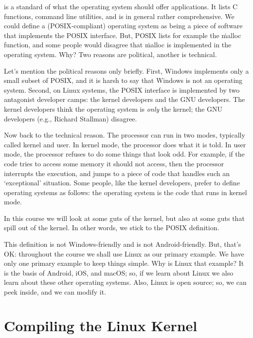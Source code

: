  is a standard of what the operating system should offer applications.
It lists C functions, command line utilities, and is in general rather comprehensive.
We could define a (POSIX-compliant) operating system as being a piece of software
  that implements the POSIX interface.
But, POSIX lists for example the \.{malloc} function,
  and some people would disagree that \.{malloc} is implemented in the operating system.
Why?
Two reasons are political, another is technical.

Let's mention the political reasons only briefly.
First, Windows implements only a small subset of POSIX,
  and it is harsh to say that Windows is not an operating system.
Second, on Linux systems,
  the POSIX interface is implemented by two antagonist developer camps:
  the kernel developers and the GNU developers.
The kernel developers think the operating system is \emph{only} the kernel;
  the GNU developers (e.g., Richard Stallman) disagree.

Now back to the technical reason.
The processor can run in two modes, typically called kernel and user.
In kernel mode, the processor does what it is told.
In user mode, the processor refuses to do some things that look odd.
For example, if the code tries to access some memory it should not access,
  then the processor interrupts the execution,
  and jumps to a piece of code that handles such an `exceptional' situation.
Some people, like the kernel developers,
  prefer to define operating systems as follows:
  the operating system is the code that runs in kernel mode.

In this course we will look at some guts of the kernel,
  but also at some guts that spill out of the kernel.
In other words, we stick to the POSIX definition.

\medskip

This definition is not Windows-friendly and is not Android-friendly.
But, that's OK:
  throughout the course we shall use Linux as our primary example.
We have only one primary example to keep things simple.
Why is Linux that example?
It is the basis of Android, iOS, and macOS;
  so, if we learn about Linux we also learn about these other operating systems.
Also, Linux is open source;
  so, we can peek inside, and we can modify it.

\section{Compiling the Linux Kernel}

